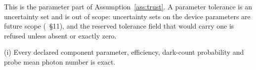 
This is the parameter part of Assumption~\ref{ass:trust}. A parameter
tolerance is an uncertainty set and is out of scope: uncertainty sets on the
device parameters are future scope (~\S11), and
the reserved tolerance field that would carry one is refused unless absent or
exactly zero.

\begin{assumption}\label{ass:exact}
(i) Every declared component parameter, efficiency, dark-count probability and
probe mean photon number is exact.
\end{assumption}
